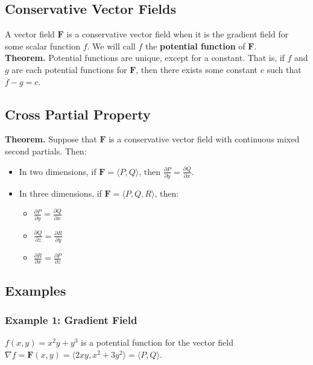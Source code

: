 \subsection{Conservative Vector Fields}
A vector field \(\mathbf{F}\) is a conservative vector field when it is the gradient field for some scalar function \(f\). We will call \(f\) the \textbf{potential function} of \(\mathbf{F}\). \\

\textbf{Theorem.} Potential functions are unique, except for a constant. That is, if \(f\) and \(g\) are each potential functions for \(\mathbf{F}\), then there exists some constant \(c\) such that \(f - g = c\).

\subsection{Cross Partial Property}
\textbf{Theorem.} Suppose that \(\mathbf{F}\) is a conservative vector field with continuous mixed second partials. Then:

\begin{itemize}
    \item In two dimensions, if \(\mathbf{F} = \langle P,Q \rangle\), then \(\frac{\partial P}{\partial y} = \frac{\partial Q}{\partial x}\).
    \item In three dimensions, if \(\mathbf{F} = \langle P, Q, R \rangle\), then:
    \begin{itemize}
        \item \(\frac{\partial P}{\partial y} = \frac{\partial Q}{\partial x}\)
        \item \(\frac{\partial Q}{\partial z} = \frac{\partial R}{\partial y}\)
        \item \(\frac{\partial R}{\partial x} = \frac{\partial P}{\partial z}\)
    \end{itemize}
\end{itemize}

\subsection{Examples}

\subsubsection{Example 1: Gradient Field}

\(f(x,y) = x^{2}y + y^{3}\) is a potential function for the vector field \(\nabla f = \mathbf{F}(x,y) = \langle 2xy, x^{2} + 3y^{2} \rangle = \langle P, Q \rangle\). \\

